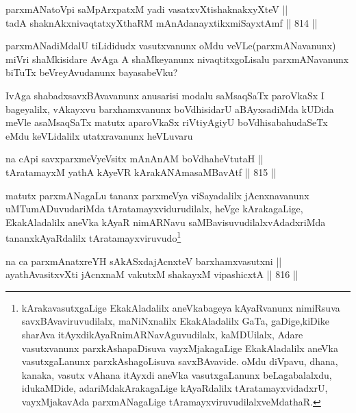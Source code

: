 \begin{shl}
parxmANatoV\s pi saMpArxpatxM yadi vasatxvXtishaknakxyXteV || \\
tadA shaknAkxnivaqtatxyXthaRM mAnAdanayxtikxmiSayxtAmf \hfill || 814 ||  
\end{shl}

\begin{artha}
parxmANadiMdalU tiLididudx vasutxvanunx oMdu veVLe(parxmANavanunx) miVri shaMkisidare AvAga A shaMkeyanunx nivaqtitxgoLisalu parxmANavanunx biTuTx beVreyAvudanunx bayasabeVku?
\end{artha}


\begin{artha}
IvAga shabadxsavxBAvavanunx anusarisi modalu saMsaqSaTx paroVkaSx I bageyalilx, vAkayxvu barxhamxvanunx boVdhisidarU aBAyxsadiMda kUDida meVle asaMsaqSaTx matutx aparoVkaSx riVtiyAgiyU boVdhisabahudaSeTx eMdu keVLidalilx utatxravanunx heVLuvaru\ndash 
\end{artha}

\begin{shl}
na cApi savxparxmeVyeV\s sitx mAnAnAM boVdhaheVtutaH || \\
tAratamayxM yathA kAyeVR kArakANAmasaMBavAtf \hfill || 815 ||  
\end{shl}

\begin{artha}
matutx parxmANagaLu tananx parxmeVya viSayadalilx jAcnxnavanunx uMTumADuvudariMda tAratamayxvidurudilalx, heVge kArakagaLige, EkakAladalilx aneVka kAyaR nimARNavu saMBavisuvudilalxvAdadxriMda tananxkAyaRdalilx tAratamayxviruvudo\footnote{kArakavasutxgaLige EkakAladalilx aneVkabageya kAyaRvanunx nimiRsuva savxBAvaviruvudilalx, maNiNxnalilx EkakAladalilx GaTa, gaDige,kiDike sharAva itAyxdikAyaRnimARNavAguvudilalx, kaMDUilalx, Adare vasutxvanunx parxkAshapaDisuva vayxMjakagaLige EkakAladalilx aneVka vasutxgaLanunx parxkAshagoLisuva savxBAvavide. oMdu diVpavu, dhana, kanaka, vasutx vAhana itAyxdi aneVka vasutxgaLanunx beLagabalalxdu, idukaMDide, adariMdakArakagaLige kAyaRdalilx tAratamayxvidadxrU, vayxMjakavAda parxmANagaLige tAramayxviruvudilalxveMdathaR.}
\end{artha}

\begin{shl}
na ca parxmAnatxreYH sAkASxdajAcnxteV barxhamxvasutxni || \\
ayathAvasitxvXti jAcnxnaM vakutxM shakayxM vipashicxtA \hfill || 816 ||  
\end{shl}

